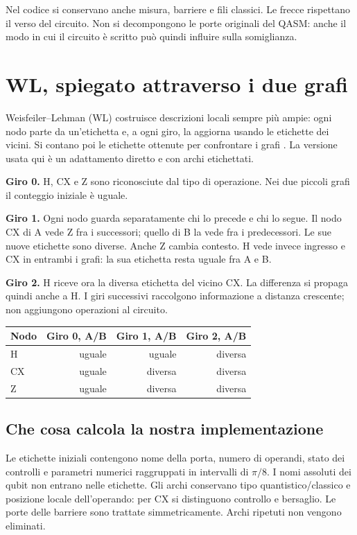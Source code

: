 \documentclass[a4paper,10pt]{article}
\begin{document}
Nel codice si conservano anche misura, barriere e fili classici. Le frecce
rispettano il verso del circuito. Non si decompongono le porte originali del QASM:
anche il modo in cui il circuito è scritto può quindi influire sulla somiglianza.

\clearpage\section{WL, spiegato attraverso i due grafi}
Weisfeiler--Lehman (WL) costruisce descrizioni locali sempre più ampie:
ogni nodo parte da un'etichetta e, a ogni giro, la aggiorna usando le etichette
dei vicini. Si contano poi le etichette ottenute per confrontare i grafi
\cite{wl}. La versione usata qui è un adattamento diretto e con archi etichettati.

\textbf{Giro 0.} H, CX e Z sono riconosciute dal tipo di operazione.
Nei due piccoli grafi il conteggio iniziale è uguale.

\textbf{Giro 1.} Ogni nodo guarda separatamente chi lo precede e chi lo segue.
Il nodo CX di A vede Z fra i successori; quello di B la vede fra i predecessori.
Le sue nuove etichette sono diverse. Anche Z cambia contesto.
H vede invece ingresso e CX in entrambi i grafi: la sua etichetta resta uguale fra A e B.

\textbf{Giro 2.} H riceve ora la diversa etichetta del vicino CX.
La differenza si propaga quindi anche a H. I giri successivi raccolgono
informazione a distanza crescente; non aggiungono operazioni al circuito.
\par\medskip\begingroup\small\renewcommand{\arraystretch}{1.18}\setlength{\tabcolsep}{5pt}
\begin{tabularx}{\linewidth}{Xrrr}\toprule
Nodo & Giro 0, A/B & Giro 1, A/B & Giro 2, A/B\\\midrule
H & uguale & uguale & diversa\\
CX & uguale & diversa & diversa\\
Z & uguale & diversa & diversa\\
\bottomrule\end{tabularx}\endgroup\par
\subsection{Che cosa calcola la nostra implementazione}
Le etichette iniziali contengono nome della porta, numero di operandi,
stato dei controlli e parametri numerici raggruppati in intervalli di $\pi/8$.
I nomi assoluti dei qubit non entrano nelle etichette. Gli archi conservano
tipo quantistico/classico e posizione locale dell'operando: per CX si distinguono
controllo e bersaglio. Le porte delle barriere sono trattate simmetricamente.
Archi ripetuti non vengono eliminati.
\end{document}
